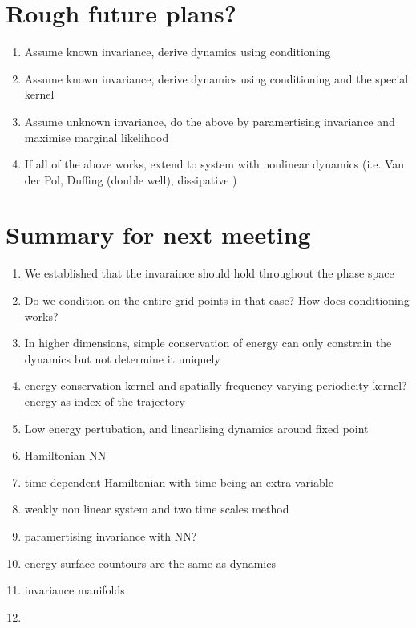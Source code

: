 \documentclass{article}
\begin{document}
\section*{Rough future plans?}
\begin{enumerate}
  \item Assume known invariance, derive dynamics using conditioning
  \item Assume known invariance, derive dynamics using conditioning and the special kernel
  \item Assume unknown invariance, do the above by paramertising invariance and maximise marginal likelihood
  \item If all of the above works, extend to system with nonlinear dynamics (i.e. Van der Pol, Duffing (double well), dissipative )
\end{enumerate}
\fi
\section*{Summary for next meeting}
\begin{enumerate}
  \item We established that the invaraince should hold throughout the phase space
  \item Do we condition on the entire grid points in that case? How does conditioning works?
  \item In higher dimensions, simple conservation of energy can only constrain the dynamics but not determine it uniquely
  \item energy conservation kernel and spatially frequency varying periodicity kernel? energy as index of the trajectory
  \item Low energy pertubation, and linearlising dynamics around fixed point
  \item Hamiltonian NN
  \item time dependent Hamiltonian with time being an extra variable
  \item weakly non linear system and two time scales method
  \item paramertising invariance with NN?
  \item energy surface countours are the same as dynamics
  \item invariance manifolds
  \item 
\end{enumerate}
\end{document}
